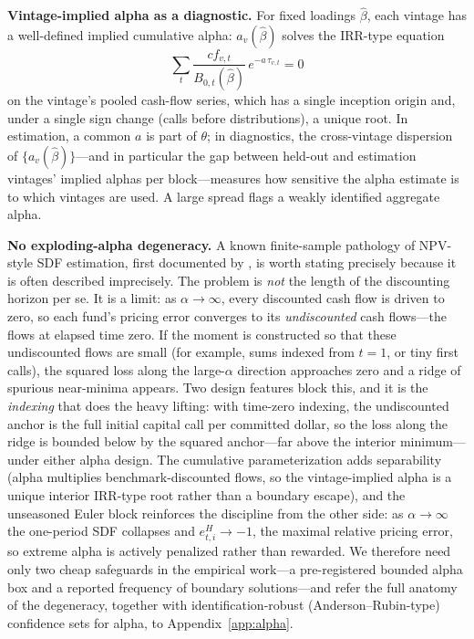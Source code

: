 \documentclass[11pt]{article}
\begin{document}
\textbf{Vintage-implied alpha as a diagnostic.} For fixed loadings \(\hat\beta\), each vintage has a well-defined implied cumulative alpha: \(a_v(\hat\beta)\) solves the IRR-type equation
\[
\sum_t \frac{cf_{v,t}}{B_{0,t}(\hat\beta)}\,e^{-a\,\tau_{v,t}}=0
\]
on the vintage's pooled cash-flow series, which has a single inception origin and, under a single sign change (calls before distributions), a unique root. In estimation, a common \(a\) is part of \(\theta\); in diagnostics, the cross-vintage dispersion of \(\{a_v(\hat\beta)\}\)---and in particular the gap between held-out and estimation vintages' implied alphas per block---measures how sensitive the alpha estimate is to which vintages are used. A large spread flags a weakly identified aggregate alpha.

\textbf{No exploding-alpha degeneracy.} A known finite-sample pathology of NPV-style SDF estimation, first documented by \citet{DriessenLinPhalippou2012}, is worth stating precisely because it is often described imprecisely. The problem is \emph{not} the length of the discounting horizon per se. It is a limit: as \(\alpha\to\infty\), every discounted cash flow is driven to zero, so each fund's pricing error converges to its \emph{undiscounted} cash flows---the flows at elapsed time zero. If the moment is constructed so that these undiscounted flows are small (for example, sums indexed from \(t=1\), or tiny first calls), the squared loss along the large-\(\alpha\) direction approaches zero and a ridge of spurious near-minima appears. Two design features block this, and it is the \emph{indexing} that does the heavy lifting: with time-zero indexing, the undiscounted anchor is the full initial capital call per committed dollar, so the loss along the ridge is bounded below by the squared anchor---far above the interior minimum---under either alpha design. The cumulative parameterization adds separability (alpha multiplies benchmark-discounted flows, so the vintage-implied alpha is a unique interior IRR-type root rather than a boundary escape), and the unseasoned Euler block reinforces the discipline from the other side: as \(\alpha\to\infty\) the one-period SDF collapses and \(e^H_{t,i}\to-1\), the maximal relative pricing error, so extreme alpha is actively penalized rather than rewarded. We therefore need only two cheap safeguards in the empirical work---a pre-registered bounded alpha box and a reported frequency of boundary solutions---and refer the full anatomy of the degeneracy, together with identification-robust (Anderson--Rubin-type) confidence sets for alpha, to Appendix~\ref{app:alpha}.
\end{document}
